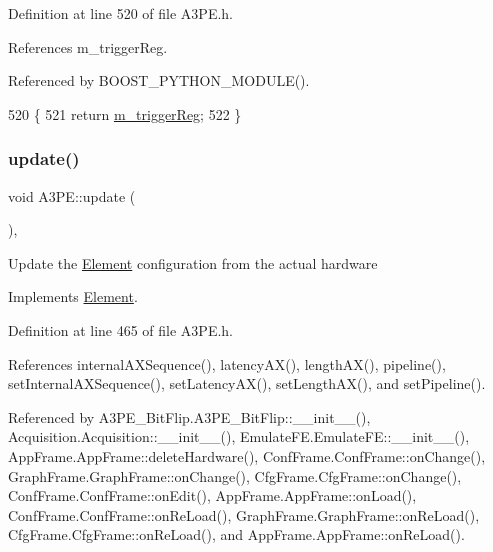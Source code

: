 Definition at line 520 of file A3\+P\+E.\+h.



References m\+\_\+trigger\+Reg.



Referenced by B\+O\+O\+S\+T\+\_\+\+P\+Y\+T\+H\+O\+N\+\_\+\+M\+O\+D\+U\+L\+E().


\begin{DoxyCode}
520                         \{
521     \textcolor{keywordflow}{return} \hyperlink{classA3PE_a750158ae488121ab7969452f061e678c}{m\_triggerReg};
522   \}
\end{DoxyCode}
\mbox{\label{classA3PE_a9e9b5ba5bd0ee19470c80761269a00f6}} 
\subsubsection{\texorpdfstring{update()}{update()}}
{\footnotesize\ttfamily void A3\+P\+E\+::update (\begin{DoxyParamCaption}{ }\end{DoxyParamCaption})\hspace{0.3cm}{\ttfamily [inline]}, {\ttfamily [virtual]}}

Update the \hyperlink{classElement}{Element} configuration from the actual hardware 

Implements \hyperlink{classElement_a4e6c83efae95616ebddd03c793a26661}{Element}.



Definition at line 465 of file A3\+P\+E.\+h.



References internal\+A\+X\+Sequence(), latency\+A\+X(), length\+A\+X(), pipeline(), set\+Internal\+A\+X\+Sequence(), set\+Latency\+A\+X(), set\+Length\+A\+X(), and set\+Pipeline().



Referenced by A3\+P\+E\+\_\+\+Bit\+Flip.\+A3\+P\+E\+\_\+\+Bit\+Flip\+::\+\_\+\+\_\+init\+\_\+\+\_\+(), Acquisition.\+Acquisition\+::\+\_\+\+\_\+init\+\_\+\+\_\+(), Emulate\+F\+E.\+Emulate\+F\+E\+::\+\_\+\+\_\+init\+\_\+\+\_\+(), App\+Frame.\+App\+Frame\+::delete\+Hardware(), Conf\+Frame.\+Conf\+Frame\+::on\+Change(), Graph\+Frame.\+Graph\+Frame\+::on\+Change(), Cfg\+Frame.\+Cfg\+Frame\+::on\+Change(), Conf\+Frame.\+Conf\+Frame\+::on\+Edit(), App\+Frame.\+App\+Frame\+::on\+Load(), Conf\+Frame.\+Conf\+Frame\+::on\+Re\+Load(), Graph\+Frame.\+Graph\+Frame\+::on\+Re\+Load(), Cfg\+Frame.\+Cfg\+Frame\+::on\+Re\+Load(), and App\+Frame.\+App\+Frame\+::on\+Re\+Load().


